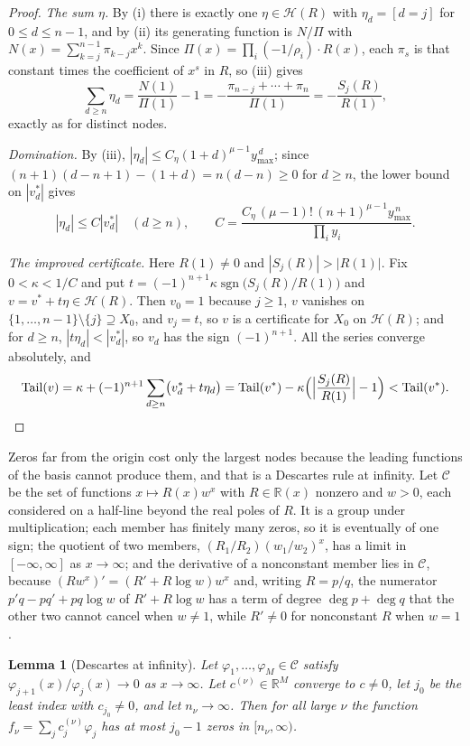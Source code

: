 \documentclass[11pt]{article}
\newtheorem{lemma}[theorem]{Lemma}
\theoremstyle{definition}
\theoremstyle{plain}
\newcommand{\R}{\mathbb R}
\DeclareMathOperator{\Tail}{Tail}
\DeclareMathOperator{\sgn}{sgn}
\begin{document}
\begin{proof}
\emph{The sum $\eta$.}  By (i) there is exactly one $\eta\in\mathcal H(R)$
with $\eta_d=[d=j]$ for $0\le d\le n-1$, and by (ii) its generating function
is $N/\Pi$ with $N(x)=\sum_{k=j}^{n-1}\pi_{k-j}x^k$.  Since
$\Pi(x)=\prod_i(-1/\rho_i)\cdot R(x)$, each $\pi_s$ is that constant times
the coefficient of $x^s$ in $R$, so (iii) gives
\[
  \sum_{d\ge n}\eta_d=\frac{N(1)}{\Pi(1)}-1
  =-\frac{\pi_{n-j}+\cdots+\pi_n}{\Pi(1)}
  =-\frac{S_j(R)}{R(1)} ,
\]
exactly as for distinct nodes.

\emph{Domination.}  By (iii), $|\eta_d|\le C_\eta(1+d)^{\mu-1}y_{\max}^{\,d}$;
since $(n+1)(d-n+1)-(1+d)=n(d-n)\ge0$ for $d\ge n$, the lower bound on
$|v^*_d|$ gives
\[
  |\eta_d|\le C|v^*_d|\quad(d\ge n),\qquad
  C=\frac{C_\eta\,(\mu-1)!\,(n+1)^{\mu-1}y_{\max}^{\,n}}{\prod_iy_i}.
\]

\emph{The improved certificate.}  Here $R(1)\ne0$ and $|S_j(R)|>|R(1)|$.
Fix $0<\kappa<1/C$ and put $t=(-1)^{n+1}\kappa\sgn\bigl(S_j(R)/R(1)\bigr)$
and $v=v^*+t\eta\in\mathcal H(R)$.  Then $v_0=1$ because $j\ge1$, $v$
vanishes on $\{1,\ldots,n-1\}\setminus\{j\}\supseteq X_0$, and $v_j=t$, so
$v$ is a certificate for $X_0$ on $\mathcal H(R)$; and for $d\ge n$,
$|t\eta_d|<|v^*_d|$, so $v_d$ has the sign $(-1)^{n+1}$.  All the series
converge absolutely, and
\[
  \Tail(v)=\kappa+(-1)^{n+1}\sum_{d\ge n}\bigl(v^*_d+t\eta_d\bigr)
  =\Tail(v^*)-\kappa\Bigl(\Bigl|\frac{S_j(R)}{R(1)}\Bigr|-1\Bigr)
  <\Tail(v^*).
\]
\end{proof}

Zeros far from the origin cost only the largest nodes because the leading
functions of the basis cannot produce them, and that is a Descartes rule at
infinity.  Let $\mathcal C$ be the
set of functions $x\mapsto R(x)w^x$ with $R\in\R(x)$ nonzero and $w>0$, each
considered on a half-line beyond the real poles of $R$.  It is a group under
multiplication; each member has finitely many zeros, so it is eventually of
one sign; the quotient of two members,
$(R_1/R_2)(w_1/w_2)^x$, has a limit in $[-\infty,\infty]$ as $x\to\infty$;
and the derivative of a nonconstant member lies in $\mathcal C$, because
$(Rw^x)'=(R'+R\log w)w^x$ and, writing $R=p/q$, the numerator
$p'q-pq'+pq\log w$ of $R'+R\log w$ has a term of degree $\deg p+\deg q$ that
the other two cannot cancel when $w\ne1$, while $R'\ne0$ for nonconstant $R$
when $w=1$.

\begin{lemma}[Descartes at infinity]\label{lem:infinity}
Let $\varphi_1,\ldots,\varphi_M\in\mathcal C$ satisfy
$\varphi_{j+1}(x)/\varphi_j(x)\to0$ as $x\to\infty$.  Let
$c^{(\nu)}\in\R^M$ converge to $c\ne0$, let $j_0$ be the least index with
$c_{j_0}\ne0$, and let $n_\nu\to\infty$.  Then for all large $\nu$ the
function $f_\nu=\sum_jc^{(\nu)}_j\varphi_j$ has at most $j_0-1$ zeros in
$[n_\nu,\infty)$.
\end{lemma}
\end{document}
